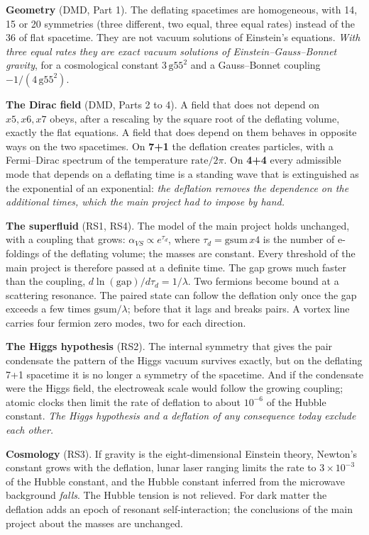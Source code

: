 \documentclass[
  10pt,
]{article}
\begin{document}
\textbf{Geometry} (DMD, Part 1). The deflating spacetimes are
homogeneous, with 14, 15 or 20 symmetries (three different, two equal,
three equal rates) instead of the 36 of flat spacetime. They are not
vacuum solutions of Einstein's equations. \emph{With three equal rates
they are exact vacuum solutions of Einstein--Gauss--Bonnet gravity}, for
a cosmological constant \(3\,\mathrm{g55}^2\) and a Gauss--Bonnet
coupling \(-1/(4\,\mathrm{g55}^2)\).

\textbf{The Dirac field} (DMD, Parts 2 to 4). A field that does not
depend on \(x5,x6,x7\) obeys, after a rescaling by the square root of
the deflating volume, exactly the flat equations. A field that does
depend on them behaves in opposite ways on the two spacetimes. On
\textbf{7+1} the deflation creates particles, with a Fermi--Dirac
spectrum of the temperature \(\mathrm{rate}/2\pi\). On \textbf{4+4}
every admissible mode that depends on a deflating time is a standing
wave that is extinguished as the exponential of an exponential:
\emph{the deflation removes the dependence on the additional times,
which the main project had to impose by hand.}

\textbf{The superfluid} (RS1, RS4). The model of the main project holds
unchanged, with a coupling that grows:
\(\alpha_{VS}\propto e^{\tau_d}\), where \(\tau_d=\mathrm{gsum}\,x4\) is
the number of e-foldings of the deflating volume; the masses are
constant. Every threshold of the main project is therefore passed at a
definite time. The gap grows much faster than the coupling,
\(d\ln(\mathrm{gap})/d\tau_d=1/\lambda\). Two fermions become bound at a
scattering resonance. The paired state can follow the deflation only
once the gap exceeds a few times \(\mathrm{gsum}/\lambda\); before that
it lags and breaks pairs. A vortex line carries four fermion zero modes,
two for each direction.

\textbf{The Higgs hypothesis} (RS2). The internal symmetry that gives
the pair condensate the pattern of the Higgs vacuum survives exactly,
but on the deflating 7+1 spacetime it is no longer a symmetry of the
spacetime. And if the condensate were the Higgs field, the electroweak
scale would follow the growing coupling; atomic clocks then limit the
rate of deflation to about \(10^{-6}\) of the Hubble constant. \emph{The
Higgs hypothesis and a deflation of any consequence today exclude each
other.}

\textbf{Cosmology} (RS3). If gravity is the eight-dimensional Einstein
theory, Newton's constant grows with the deflation, lunar laser ranging
limits the rate to \(3\times10^{-3}\) of the Hubble constant, and the
Hubble constant inferred from the microwave background \emph{falls}. The
Hubble tension is not relieved. For dark matter the deflation adds an
epoch of resonant self-interaction; the conclusions of the main project
about the masses are unchanged.
\end{document}
